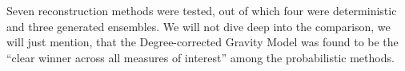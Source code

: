 Seven reconstruction methods were tested, out of which four were deterministic and three generated ensembles. We will not dive deep into the comparison, we will just mention, that the Degree-corrected Gravity Model was found to be the ``clear winner across all measures of interest'' among the probabilistic methods. 